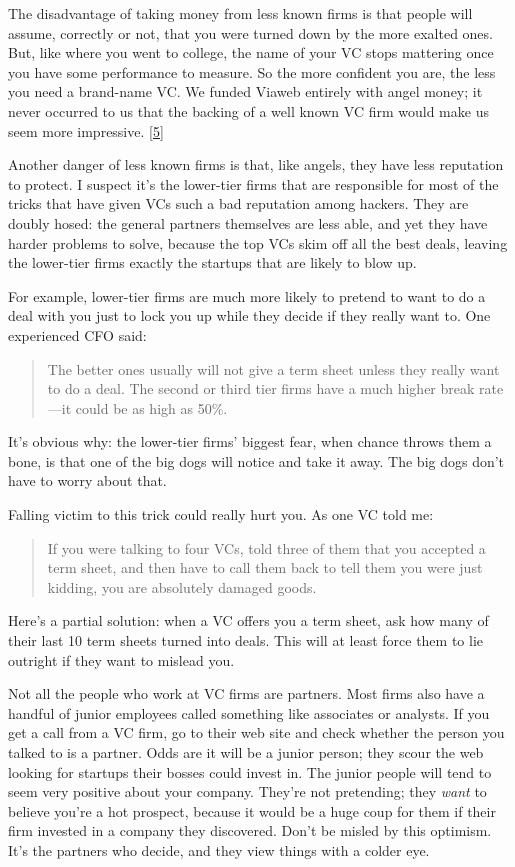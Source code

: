 The disadvantage of taking money from less known firms is that people
will assume, correctly or not, that you were turned down by the more
exalted ones. But, like where you went to college, the name of your VC
stops mattering once you have some performance to measure. So the more
confident you are, the less you need a brand-name VC. We funded Viaweb
entirely with angel money; it never occurred to us that the backing of a
well known VC firm would make us seem more impressive.
{[}\hyperref[f5n]{5}{]}

Another danger of less known firms is that, like angels, they have less
reputation to protect. I suspect it's the lower-tier firms that are
responsible for most of the tricks that have given VCs such a bad
reputation among hackers. They are doubly hosed: the general partners
themselves are less able, and yet they have harder problems to solve,
because the top VCs skim off all the best deals, leaving the lower-tier
firms exactly the startups that are likely to blow up.

For example, lower-tier firms are much more likely to pretend to want to
do a deal with you just to lock you up while they decide if they really
want to. One experienced CFO said:

\begin{quote}
The better ones usually will not give a term sheet unless they really
want to do a deal. The second or third tier firms have a much higher
break rate---it could be as high as 50\%.
\end{quote}

It's obvious why: the lower-tier firms' biggest fear, when chance throws
them a bone, is that one of the big dogs will notice and take it away.
The big dogs don't have to worry about that.

Falling victim to this trick could really hurt you. As one VC told me:

\begin{quote}
If you were talking to four VCs, told three of them that you accepted a
term sheet, and then have to call them back to tell them you were just
kidding, you are absolutely damaged goods.
\end{quote}

Here's a partial solution: when a VC offers you a term sheet, ask how
many of their last 10 term sheets turned into deals. This will at least
force them to lie outright if they want to mislead you.

Not all the people who work at VC firms are partners. Most firms also
have a handful of junior employees called something like associates or
analysts. If you get a call from a VC firm, go to their web site and
check whether the person you talked to is a partner. Odds are it will be
a junior person; they scour the web looking for startups their bosses
could invest in. The junior people will tend to seem very positive about
your company. They're not pretending; they \emph{want} to believe you're
a hot prospect, because it would be a huge coup for them if their firm
invested in a company they discovered. Don't be misled by this optimism.
It's the partners who decide, and they view things with a colder eye.

